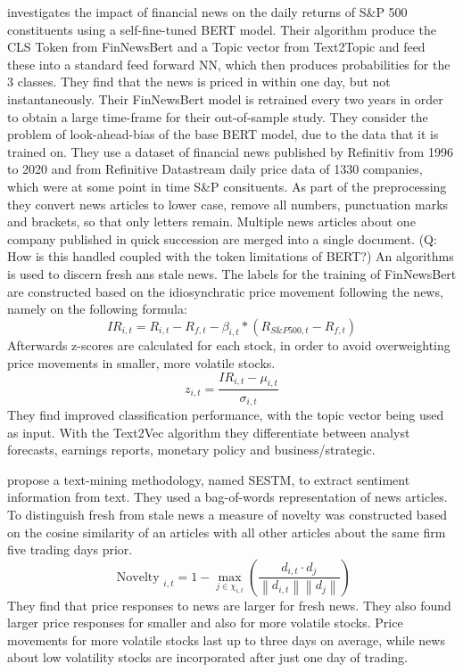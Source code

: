 \documentclass[12pt,a4paper]{article}
\begin{document}
	
	\textbf{\cite{salbrechter_financial_2021}} investigates the impact of financial news on the daily returns of S\&P 500 constituents using a self-fine-tuned BERT model. 
	Their algorithm produce the CLS Token from FinNewsBert and a Topic vector from Text2Topic and feed these into a standard feed forward NN, which then produces probabilities for the 3 classes.
	They find that the news is priced in within one day, but not instantaneously.
	Their FinNewsBert model is retrained every two years in order to obtain a large time-frame for their out-of-sample study.
	They consider the problem of look-ahead-bias of the base BERT model, due to the data that it is trained on.
	They use a dataset of financial news published by Refinitiv from 1996 to 2020 and from Refinitive Datastream daily price data of 1330 companies, which were at some point in time S\&P consituents.
	As part of the preprocessing they convert news articles to lower case, remove all numbers, punctuation marks and brackets, so that only letters remain.
	Multiple news articles about one company published in quick succession are merged into a single document.
	(Q: How is this handled coupled with the token limitations of BERT?)
	An algorithms is used to discern fresh ans stale news.
	The labels for the training of FinNewsBert are constructed based on the idiosynchratic price movement following the news,
	namely on the following formula: 
	$$I R_{i, t}=R_{i, t}-R_{f, t}-\beta_{i, t} *\left(R_{S \& P 500, t}-R_{f, t}\right)$$
	Afterwards z-scores are calculated for each stock, in order to avoid overweighting price movements in smaller, more volatile stocks.
	$$z_{i, t}=\frac{I R_{i, t}-\mu_{i, t}}{\sigma_{i, t}}$$
	They find improved classification performance, with the topic vector being used as input.
	With the Text2Vec algorithm they differentiate between analyst forecasts, earnings reports, monetary policy and business/strategic.
	
	
	\bigskip
	\textbf{\cite{ke_predicting_2020}} propose a text-mining methodology, named SESTM, to extract sentiment information from text. 
	They used a bag-of-words representation of news articles.
	To distinguish fresh from stale news a measure of novelty was constructed based on the cosine similarity of an articles with all other articles about the same firm five trading days prior.
	$$
	\text { Novelty }_{i, t}=1-\max _{j \in \chi_{i, t}}\left(\frac{d_{i, t} \cdot d_j}{\left\|d_{i, t}\right\|\left\|d_j\right\|}\right)
	$$
	They find that price responses to news are larger for fresh news. 
	They also found larger price responses for smaller and also for more volatile stocks.
	Price movements for more volatile stocks last up to three days on average, while news about low volatility stocks are incorporated after just one day of trading.
	
\end{document}
